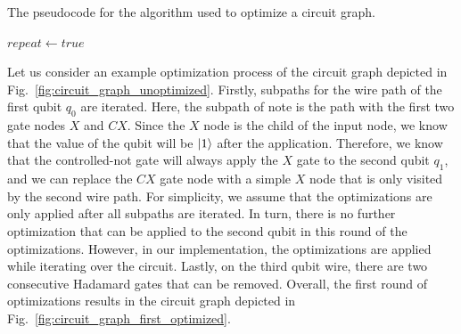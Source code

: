 \begin{algorithm}
    \caption{The pseudocode for the algorithm used to optimize a circuit graph.}
    \label{alg:concept_optimizationAlgorithm}
    $repeat \gets true$\;
\end{algorithm}

Let us consider an example optimization process of the circuit graph depicted in Fig.~\ref{fig:circuit_graph_unoptimized}. Firstly, subpaths for the wire path of the first qubit $q_0$ are iterated. Here, the subpath of note is the path with the first two gate nodes $X$ and $CX$. Since the $X$ node is the child of the input node, we know that the value of the qubit will be $\ket{1}$ after the application. Therefore, we know that the controlled-not gate will always apply the $X$ gate to the second qubit $q_1$, and we can replace the $CX$ gate node with a simple $X$ node that is only visited by the second wire path. For simplicity, we assume that the optimizations are only applied after all subpaths are iterated. In turn, there is no further optimization that can be applied to the second qubit in this round of the optimizations. However, in our implementation, the optimizations are applied while iterating over the circuit. Lastly, on the third qubit wire, there are two consecutive Hadamard gates that can be removed. Overall, the first round of optimizations results in the circuit graph depicted in Fig.~\ref{fig:circuit_graph_first_optimized}. 
 
